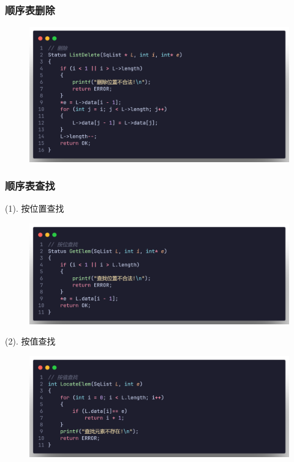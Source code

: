 \subsubsection{顺序表删除}

\begin{figure}[H]
    \centering
    \includegraphics[scale=0.2]{"figure/Note/LinearList/SqDel.png"}
\end{figure} 

\subsubsection{顺序表查找}

(1). 按位置查找

\begin{figure}[H]
    \centering
    \includegraphics[scale=0.2]{"figure/Note/LinearList/SqNumSer.png"}
\end{figure} 

(2). 按值查找

\begin{figure}[H]
    \centering
    \includegraphics[scale=0.2]{"figure/Note/LinearList/SqItemSer.png"}
\end{figure} 


